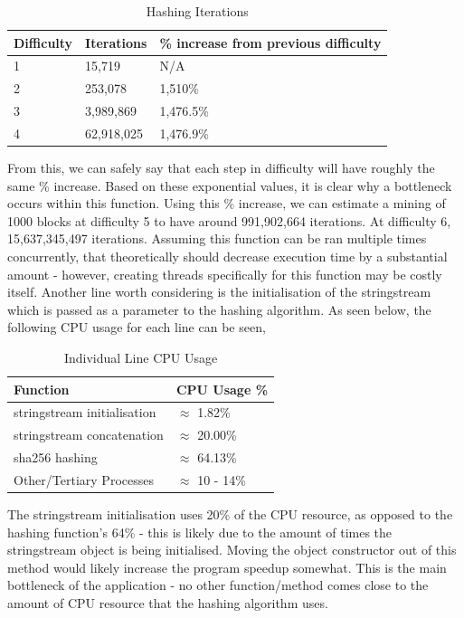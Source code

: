 \documentclass[12pt, a4paper]{article}
\begin{document}
\begin{table}[H]
    \centering
    \begin{tabular}{| l | l | l |}
    \hline
    Difficulty & Iterations & \% increase from previous difficulty \\ \hline
    1 & 15,719 & N/A \\ \hline
    2 & 253,078 & 1,510\% \\ \hline
    3 & 3,989,869 & 1,476.5\% \\ \hline
    4 & 62,918,025 & 1,476.9\% \\ \hline
    \end{tabular}
    \caption{Hashing Iterations}
\end{table}

From this, we can safely say that each step in difficulty will have roughly the same \% increase. Based on these exponential values, it is clear why a bottleneck occurs within this function. Using this \% increase, we can estimate a mining of 1000 blocks at difficulty 5 to have around 991,902,664 iterations. At difficulty 6, 15,637,345,497 iterations. Assuming this function can be ran multiple times concurrently, that theoretically should decrease execution time by a substantial amount - however, creating threads specifically for this function may be costly itself. Another line worth considering is the initialisation of the stringstream which is passed as a parameter to the hashing algorithm. As seen below, the following CPU usage for each line can be seen, \\

\begin{table}[H]
    \centering
    \begin{tabular}{| l | l |}
    \hline
    Function & CPU Usage \%  \\ \hline
    stringstream initialisation & $\approx$ 1.82\% \\ \hline
    stringstream concatenation & $\approx$ 20.00\% \\ \hline
    sha256 hashing & $\approx$ 64.13\% \\ \hline
    Other/Tertiary Processes & $\approx$ 10 - 14\% \\ \hline
    \end{tabular}
    \caption{Individual Line CPU Usage}
\end{table}

The stringstream initialisation uses 20\% of the CPU resource, as opposed to the hashing function's 64\% - this is likely due to the amount of times the stringstream object is being initialised. Moving the object constructor out of this method would likely increase the program speedup somewhat. This is the main bottleneck of the application - no other function/method comes close to the amount of CPU resource that the hashing algorithm uses. 
\end{document}
